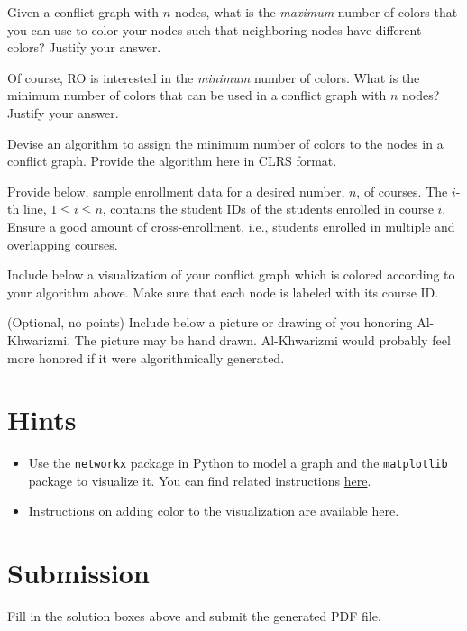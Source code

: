 \documentclass[a4paper]{exam}
\begin{document}
\begin{questions}

\question
  Given a conflict graph with $n$ nodes, what is the \textit{maximum} number of colors that you can use to color your nodes such that neighboring nodes have different colors? Justify your answer.
  \begin{solution}
    
  \end{solution}
\question
  Of course, RO is interested in the \textit{minimum} number of colors. What is the minimum number of colors that can be used in a conflict graph with $n$ nodes? Justify your answer.
  \begin{solution}
    
  \end{solution}

\question
  Devise an algorithm to assign the minimum number of colors to the nodes in a conflict graph. Provide the algorithm here in CLRS format.
  \begin{solution}
    
  \end{solution}

\question
  Provide below, sample enrollment data for a desired number, $n$, of courses. The $i$-th line, $1\le i\le n$, contains the student IDs of the students enrolled in course $i$. Ensure a good amount of cross-enrollment, i.e., students enrolled in multiple and overlapping courses.
  \begin{solution}
    
  \end{solution}

\question
  Include below a visualization of your conflict graph which is colored according to your algorithm above. Make sure that each node is labeled with its course ID.
  \begin{solution}
    
  \end{solution}

  \bonusquestion (Optional, no points)
  Include below a picture or drawing of you honoring Al-Khwarizmi. The picture may be hand drawn. Al-Khwarizmi would probably feel more honored if it were algorithmically generated.
  \begin{solution}
    
  \end{solution}  
\end{questions}

\section*{Hints}
\begin{itemize}
\item Use the \texttt{networkx} package in Python to model a graph and the \texttt{matplotlib} package to visualize it. You can find related instructions \href{https://www.geeksforgeeks.org/python-visualize-graphs-generated-in-networkx-using-matplotlib/}{here}.
\item Instructions on adding color to the visualization are available \href{https://stackoverflow.com/questions/27030473/how-to-set-colors-for-nodes-in-networkx}{here}.
\end{itemize}

\section*{Submission}

Fill in the solution boxes above and submit the generated PDF file.
\end{document}
